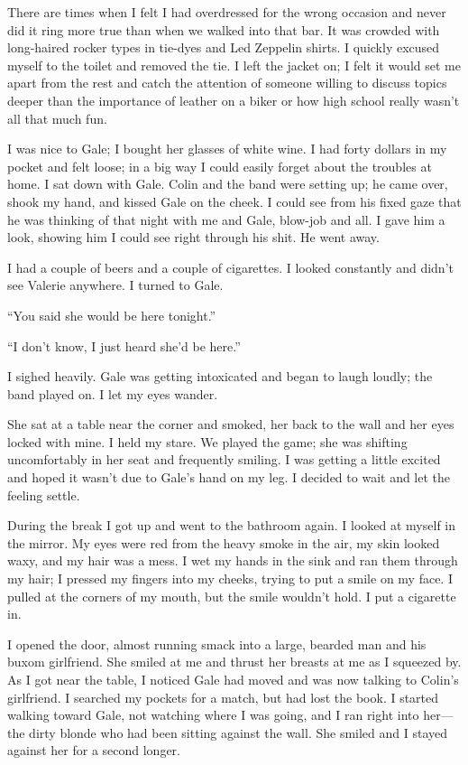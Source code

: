 There are times when I felt I had overdressed for the wrong occasion and
never did it ring more true than when we walked into that bar. It was
crowded with long-haired rocker types in tie-dyes and Led Zeppelin
shirts. I quickly excused myself to the toilet and removed the tie. I
left the jacket on; I felt it would set me apart from the rest and catch
the attention of someone willing to discuss topics deeper than the
importance of leather on a biker or how high school really wasn't all
that much fun.

I was nice to Gale; I bought her glasses of white wine. I had forty
dollars in my pocket and felt loose; in a big way I could easily forget
about the troubles at home. I sat down with Gale. Colin and the band
were setting up; he came over, shook my hand, and kissed Gale on the
cheek. I could see from his fixed gaze that he was thinking of that
night with me and Gale, blow-job and all. I gave him a look, showing him
I could see right through his shit. He went away.

I had a couple of beers and a couple of cigarettes. I looked constantly
and didn't see Valerie anywhere. I turned to Gale.

``You said she would be here tonight.''

``I don't know, I just heard she'd be here.''

I sighed heavily. Gale was getting intoxicated and began to laugh
loudly; the band played on. I let my eyes wander.

She sat at a table near the corner and smoked, her back to the wall and
her eyes locked with mine. I held my stare. We played the game; she was
shifting uncomfortably in her seat and frequently smiling. I was getting
a little excited and hoped it wasn't due to Gale's hand on my leg. I
decided to wait and let the feeling settle.

During the break I got up and went to the bathroom again. I looked at
myself in the mirror. My eyes were red from the heavy smoke in the air,
my skin looked waxy, and my hair was a mess. I wet my hands in the sink
and ran them through my hair; I pressed my fingers into my cheeks,
trying to put a smile on my face. I pulled at the corners of my mouth,
but the smile wouldn't hold. I put a cigarette in.

I opened the door, almost running smack into a large, bearded man and
his buxom girlfriend. She smiled at me and thrust her breasts at me as I
squeezed by. As I got near the table, I noticed Gale had moved and was
now talking to Colin's girlfriend. I searched my pockets for a match,
but had lost the book. I started walking toward Gale, not watching where
I was going, and I ran right into her---the dirty blonde who had been
sitting against the wall. She smiled and I stayed against her for a
second longer.

